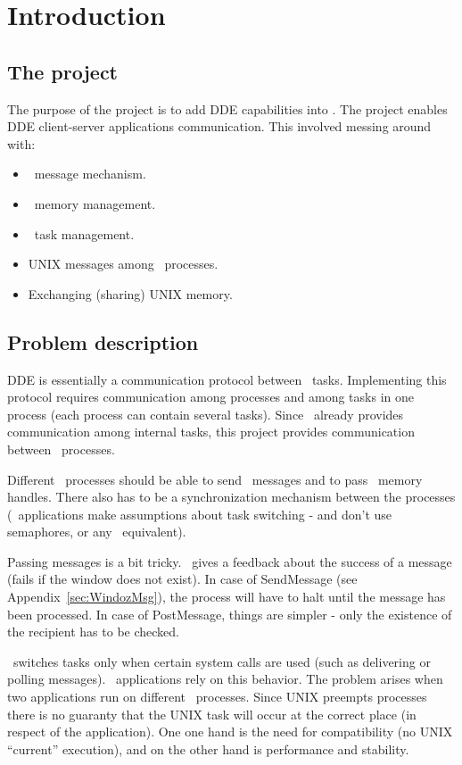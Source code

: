 \section{Introduction}

\subsection{The project}
The purpose of the project is to add DDE capabilities into \Wine.
The project enables \Wine{} DDE client-server applications communication.
This involved messing around with:
\begin{itemize}
  \item \windoz\ message mechanism.
  \item \windoz\ memory management.
  \item \windoz\ task management.
  \item UNIX messages among  \Wine\ processes.
  \item Exchanging (sharing) UNIX memory.
\end{itemize}

\subsection{Problem description}
DDE is essentially a communication protocol between \windoz\
tasks. Implementing this protocol requires communication among
\Wine{} processes and among tasks in one process (each \Wine{} process
can contain several tasks). Since \Wine\ already provides
communication among internal tasks, this project provides communication
between \Wine\ processes. 

Different \Wine\ processes should be able to send \windoz\ messages
and to pass \windoz\ memory handles. There also has to be a
synchronization mechanism between the processes (\windoz\ applications
make assumptions about task switching - and don't use semaphores, or
any \windoz\ equivalent).

Passing messages is a bit tricky. \windoz\ gives a feedback about the
success of a message (fails if the window does not exist).
In case of SendMessage (see Appendix~\ref{sec:WindozMsg}), the process
will have to halt until the message has been processed.
In case of PostMessage, things are simpler - only the existence of the
recipient has to be checked.

\windoz\ switches tasks only when certain system calls are used (such
as delivering or polling messages). \windoz\ applications rely on this
behavior. The problem arises when two applications run on different
\Wine\ processes. Since UNIX preempts processes there is no guaranty
that the UNIX task will occur at the correct place (in respect of the
application).
One one hand is the need for compatibility (no UNIX ``current''
execution), and on the other hand is performance and stability.

